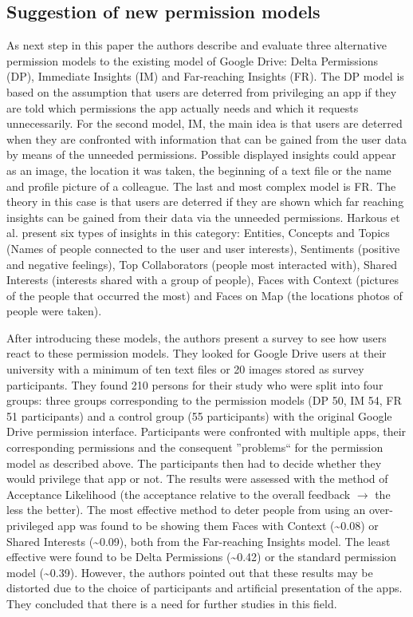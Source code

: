 \documentclass[11pt,twocolumn,a4paper,DIV=calc]{scrartcl}
\begin{document}
\subsection{Suggestion of new permission models}
As next step in this paper the authors describe and evaluate three alternative permission models to the existing model of Google Drive: Delta Permissions (DP), Immediate Insights (IM) and Far-reaching Insights (FR). The DP model is based on the assumption that users are deterred from privileging an app if they are told which permissions the app actually needs and which it requests unnecessarily. For the second model, IM, the main idea is that users are deterred when they are confronted with information that can be gained from the user data by means of the unneeded permissions. Possible displayed insights could appear as an image, the location it was taken, the beginning of a text file or the name and profile picture of a colleague. The last and most complex model is FR. 
The theory in this case is that users are deterred if they are shown which far reaching insights can be gained from their data via the unneeded permissions. 
Harkous et al. present six types of insights in this category: Entities, Concepts and Topics (Names of people connected to the user and user interests), Sentiments (positive and negative feelings), Top Collaborators (people most interacted with), Shared Interests (interests shared with a group of people), Faces with Context (pictures of the people that occurred the most) and Faces on Map (the locations photos of people were taken).

After introducing these models, the authors present a survey to see how users react to these permission models. They looked for Google Drive users at their university with a minimum of ten text files or 20 images stored as survey participants. They found 210 persons for their study who were split into four groups: three groups corresponding to the permission models (DP 50, IM 54, FR 51 participants) and a control group (55 participants) with the original Google Drive permission interface. Participants were confronted with multiple apps, their corresponding permissions and the consequent ''problems`` for the permission model as described above. The participants then had to decide whether they would privilege that app or not. The results were assessed with the method of Acceptance Likelihood (the acceptance relative to the overall feedback $\rightarrow$ the less the better). The most effective method to deter people from using an over-privileged app was found to be showing them Faces with Context (\textasciitilde 0.08) or Shared Interests (\textasciitilde 0.09), both from the Far-reaching Insights model. The least effective were found to be Delta Permissions (\textasciitilde 0.42) or the standard permission model (\textasciitilde 0.39). However, the authors pointed out that these results may be distorted due to the choice of participants and artificial presentation of the apps. They concluded that there is a need for further studies in this field.
\end{document}
